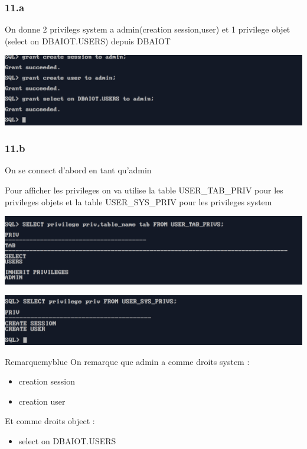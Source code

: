 \subsubsection*{11.a}
On donne 2 privilegs system a admin(creation session,user) et 1 privilege objet
(select on DBAIOT.USERS) depuis DBAIOT



\begin{center}
    \includegraphics[width=\textwidth]{ScreenShot/Partie5/grant.png}
\end{center}

\subsubsection*{11.b}
On se connect d'abord en tant qu'admin



Pour afficher les privileges on va utilise la table USER\_TAB\_PRIV
pour les privileges objets et la table USER\_SYS\_PRIV pour les privileges
system 



\begin{center}
    \includegraphics[width=\textwidth]{ScreenShot/Partie5/objpriv.png}
\end{center}

\begin{center}
    \includegraphics[width=\textwidth]{ScreenShot/Partie5/syspriv.png}
\end{center}

\begin{prettyBox}{Remarque}{myblue}
On remarque que admin a comme droits system :
\begin{itemize}
    \item creation session
    \item creation user
\end{itemize}

Et comme droits object :
\begin{itemize}
    \item select on DBAIOT.USERS
\end{itemize}
\end{prettyBox}

